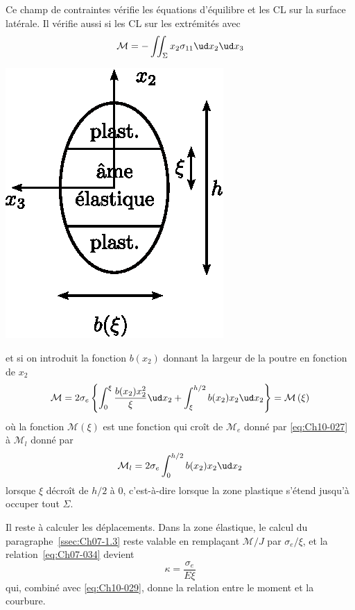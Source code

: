 \begin{multicols}{2}
    Ce champ de contraintes vérifie les équations d'équilibre et les CL sur la surface latérale.
    Il vérifie aussi si les CL sur les extrémités avec
    \[
    \mathcal{M} = - \iint_{\Sigma} x_2 \sigma_{11} \ud x_2 \ud x_3
    \]
    \columnbreak
    \begin{center}
        \includegraphics{../images/T1_Ch10-12}
    \end{center}
\end{multicols}
et si on introduit la fonction $b\left( x_2 \right)$ donnant la largeur de la poutre en fonction de $x_2$
\begin{equation}
    \mathcal{M} = 2 \sigma_e \left\{ \int_0^{\xi} \frac{b(x_2)x_2^2}{\xi} \ud x_2 + \int_{\xi}^{h/2} b(x_2)x_2 \ud x_2 \right\} = \mathcal{M} \left( \xi \right)
    \label{eq:Ch10-029}
\end{equation}
où la fonction $\mathcal{M}(\xi)$ est une fonction qui croît de $\mathcal{M}_e$ donné par \eqref{eq:Ch10-027} à $\mathcal{M}_l$ donné par 
\begin{equation}
    \mathcal{M}_l = 2 \sigma_e \int_0^{h/2} b(x_2) x_2 \ud x_2
    \label{eq:Ch10-030}
\end{equation}
lorsque $\xi$ décroît de $h/2$ à $0$, c'est-à-dire lorsque la zone plastique s'étend jusqu'à occuper tout $\Sigma$.

Il reste à calculer les déplacements.
Dans la zone élastique, le calcul du paragraphe~\ref{ssec:Ch07-1.3} reste valable en remplaçant $\mathcal{M}/J$ par $\sigma_e/\xi$, et la relation~\eqref{eq:Ch07-034} devient 
\begin{equation}
    \kappa = \frac{\sigma_e}{E \xi}
    \label{eq:Ch10-031}
\end{equation}
qui, combiné avec \eqref{eq:Ch10-029}, donne la relation entre le moment et la courbure. 

